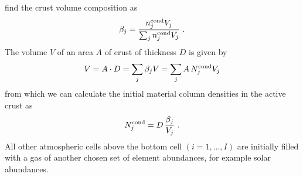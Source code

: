 \documentclass[11pt]{article}
\begin{document}
find the crust volume composition as
\begin{equation}
  \beta_j = \frac{n_j^{\rm cond} V_j}{\sum_j n_j^{\rm cond} V_j} \ .
\end{equation}
The volume $V$ of an area $A$ of crust of thickness $D$ is given by 
\begin{equation}
  V = A\cdot D = \sum_j \beta_j V = \sum_j A\,N_j^{\rm cond} V_j
\end{equation}
from which we can calculate the initial material column densities in
the active crust as
\begin{equation}
  N_j^{\rm cond} = D\,\frac{\beta_j}{V_j} \ .
\end{equation}
All other atmospheric cells above the bottom cell $(i=1,...,I)$ are
initially filled with a gas of another chosen set of element
abundances, for example solar abundances.
\end{document}
